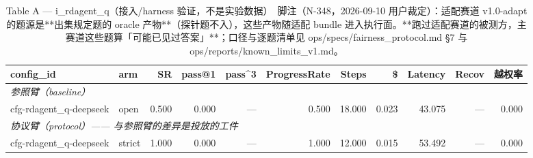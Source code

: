 \begin{table}[t]
\centering
\caption{Table A — i\_rdagent\_q（接入/harness 验证，不是实验数据）　脚注（N-348，2026-09-10 用户裁定）：适配赛道 v1.0-adapt 的题源是**出集规定题的 oracle 产物**（探针题不入），这些产物随适配 bundle 进入执行面。**跑过适配赛道的被测方，主赛道这些题算「可能已见过答案」**；口径与逐题清单见 ops/specs/fairness\_protocol.md §7 与 ops/reports/known\_limits\_v1.md。}
\label{tab:a-i_rdagent_q}
\begin{tabular}{llrrrrrrrrr}
\toprule
config\_id & arm & SR & pass@1 & pass\^{}3 & ProgressRate & Steps & \$ & Latency & Recov & 越权率 \\
\midrule
\multicolumn{11}{l}{\textit{参照臂（baseline）}} \\
cfg-rdagent\_q-deepseek & open & 0.500 & 0.000 & --- & 0.500 & 18.000 & 0.023 & 43.075 & --- & 0.000 \\
\midrule
\multicolumn{11}{l}{\textit{协议臂（protocol）—— 与参照臂的差异是投放的工件}} \\
cfg-rdagent\_q-deepseek & strict & 1.000 & 0.000 & --- & 1.000 & 12.000 & 0.015 & 53.492 & --- & 0.000 \\
\bottomrule
\end{tabular}
\end{table}

